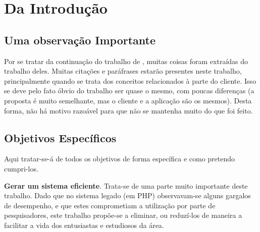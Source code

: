 \chapter{Da Introdução} \label{cap:introducao}
\minitoc \mtcskip


\section{Uma observação Importante} \label{sec:importante}

Por se tratar da continuação do trabalho de \citet*{delpo:18}, muitas coisas foram
extraídas do trabalho deles. Muitas citações e paráfrases estarão presentes neste
trabalho, principalmente quando se trata dos conceitos relacionados à parte do
cliente. Isso se deve pelo fato óbvio do trabalho ser quase o mesmo, com poucas
diferenças (a proposta é muito semelhante, mas o cliente e a aplicação são os mesmos).
Desta forma, não há motivo razoável para que não se mantenha muito do que foi feito.

\section{Objetivos Específicos}
\label{sec:goals}

Aqui tratar-se-á de todos os objetivos de forma específica e como pretendo cumpri-los.

\textbf{Gerar um sistema eficiente}. Trata-se de uma parte muito importante deste trabalho.
Dado que no sistema legado (em PHP) observavam-se alguns gargalos de desempenho, e que estes
comprometiam a utilização por parte de pesquisadores, este trabalho propõe-se a eliminar, ou
reduzí-los de maneira a facilitar a vida dos entusiastas e estudiosos da área.

